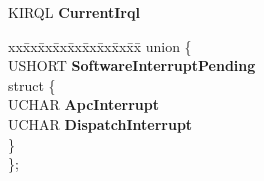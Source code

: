\begin{DoxyCompactItemize}
\begin{tabbing}
\end{tabbing}\item 
\mbox{\label{struct___k_p_c_r_ad434b6d16945df31196fee048ed0fb53}} 
K\+I\+R\+QL {\bfseries Current\+Irql}
\item 
\mbox{\label{struct___k_p_c_r_acd293de4f625b94c88e337caf56b7ee7}} 
\begin{tabbing}
xx\=xx\=xx\=xx\=xx\=xx\=xx\=xx\=xx\=\kill
union \{\\
\>USHORT {\bfseries SoftwareInterruptPending}\\
\mbox{\label{union___k_p_c_r_1_1_0D3210_ac23948592587e11059e8f8d50df64d3b}} 
\>struct \{\\
\>\>UCHAR {\bfseries ApcInterrupt}\\
\>\>UCHAR {\bfseries DispatchInterrupt}\\
\>\} \\
\}; \\


\end{tabbing}
\end{DoxyCompactItemize}
